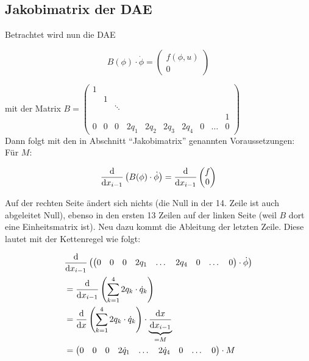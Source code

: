 \documentclass[12pt, a4paper]{scrartcl}
\begin{document}
\subsection*{Jakobimatrix der DAE}

Betrachtet wird nun die DAE 

\[ B (\phi) \cdot \dot{\phi} =
	\begin{pmatrix}
		f(\phi, u) \\ 0
	\end{pmatrix} \]
	
	mit der Matrix \( B =
		\begin{pmatrix}
			1 &   &        &   &      &      &      &      &   &      \\
			  & 1 &        &   &      &      &      &      &   &      \\
				&   & \ddots &   &      &      &      &      &   &      \\
				&   &  &   &      &      &      &      &   &   1   \\
			0	& 0 & 0      & 2q_1 & 2q_2 & 2q_3 & 2q_4 & 0 & \dots & 0
		\end{pmatrix}\)
\\

Dann folgt mit den in Abschnitt "`Jakobimatrix"' genannten Voraussetzungen: \\
Für \(M\):

\begin{align*}
	\frac{\textup{d}}{\textup{d}x_{i-1}} \left( B(\phi) \cdot \dot{\phi} \right) = \frac{\textup{d}}{\textup{d}x_{i-1}} \begin{pmatrix} f \\ 0 \end{pmatrix}
\end{align*}

Auf der rechten Seite ändert sich nichts (die Null in der 14. Zeile ist auch abgeleitet Null), ebenso in den ersten 13 Zeilen auf der linken Seite (weil \(B\) dort eine Einheitsmatrix ist). Neu dazu kommt die Ableitung der letzten Zeile. Diese lautet mit der Kettenregel wie folgt:

\begin{align*}
	& \frac{\textup{d}}{\textup{d}x_{i-1}} \left( \begin{pmatrix} 0 & 0 & 0 & 2q_1 & \dots & 2q_4 & 0 & \dots & 0 \end{pmatrix} \cdot \dot{\phi}\right)  \\
	& = \frac{\textup{d}}{\textup{d}x_{i-1}} \left( \sum_{k=1}^4{2q_k \cdot \dot{q}_k}\right) \\
	& = \frac{\textup{d}}{\textup{d}x} \left( \sum_{k=1}^4{2q_k \cdot \dot{q}_k}\right) \cdot \underbrace{\frac{\textup{d}x}{\textup{d}x_{i-1}}}_{=M} \\
	& = \begin{pmatrix} 0 & 0 & 0 & 2\dot{q}_1 & \dots & 2\dot{q}_4 & 0 & \dots & 0 \end{pmatrix} \cdot M
\end{align*}
\end{document}
